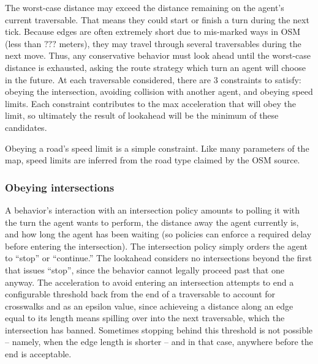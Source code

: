 \documentclass[letterpaper, 10 pt, conference]{ieeeconf}  %
\begin{document}

The worst-case distance may exceed the distance remaining on the agent's current
traversable. That means they could start or finish a turn during the next tick.
Because edges are often extremely short due to mis-marked ways in OSM (less than
$???$ meters), they may travel through several traversables during the next
move. Thus, any conservative behavior must look ahead until the worst-case
distance is exhausted, asking the route strategy which turn an agent will choose
in the future. At each traversable considered, there are 3 constraints to
satisfy: obeying the intersection, avoiding collision with another agent, and
obeying speed limits. Each constraint contributes to the max acceleration that
will obey the limit, so ultimately the result of lookahead will be the minimum
of these candidates.

Obeying a road's speed limit is a simple constraint. Like many parameters of the
map, speed limits are inferred from the road type claimed by the OSM
source.


\subsubsection{Obeying intersections}

A behavior's interaction with an intersection policy amounts to polling it with
the turn the agent wants to perform, the distance away the agent currently is,
and how long the agent has been waiting (so policies can enforce a required
delay before entering the intersection). The intersection policy simply orders
the agent to ``stop'' or ``continue.'' The lookahead considers no intersections
beyond the first that issues ``stop'', since the behavior cannot legally proceed
past that one anyway. The acceleration to avoid entering an intersection
attempts to end a configurable threshold back from the end of a traversable to
account for crosswalks and as an epsilon value, since achieveing a distance
along an edge equal to its length means spilling over into the next traversable,
which the intersection has banned. Sometimes stopping behind this threshold is
not possible -- namely, when the edge length is shorter -- and in that case,
anywhere before the end is acceptable.
\end{document}
